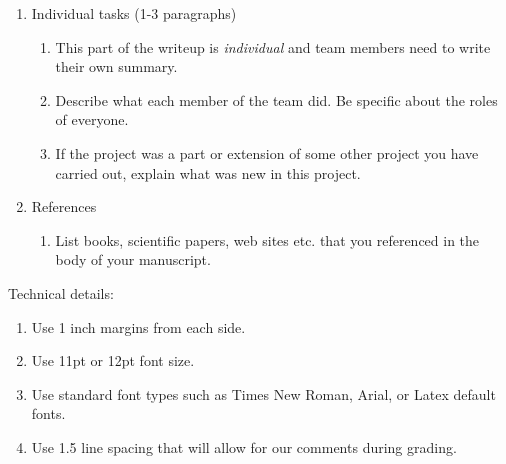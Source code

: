 \documentclass[twoside]{article}
\begin{document}
\begin{enumerate}
\item Individual tasks (1-3 paragraphs)
     \begin{enumerate}
     \item This part of the writeup is \emph{individual} and team members need to write their own summary.
     \item Describe what each member of the team did. Be specific about the roles of everyone. 
     \item If the project was a part or extension of some other project you have carried out, explain what was new in this project.
     \end{enumerate}
\item References
     \begin{enumerate}
     \item List books, scientific papers, web sites etc. that you referenced in the body of your manuscript.
     \end{enumerate}
\end{enumerate}

Technical details:
\begin{enumerate}
\item Use 1 inch margins from each side.
\item Use 11pt or 12pt font size.
\item Use standard font types such as Times New Roman, Arial, or Latex default fonts.
\item Use 1.5 line spacing that will allow for our comments during grading.
\end{enumerate}

%
\end{document}
